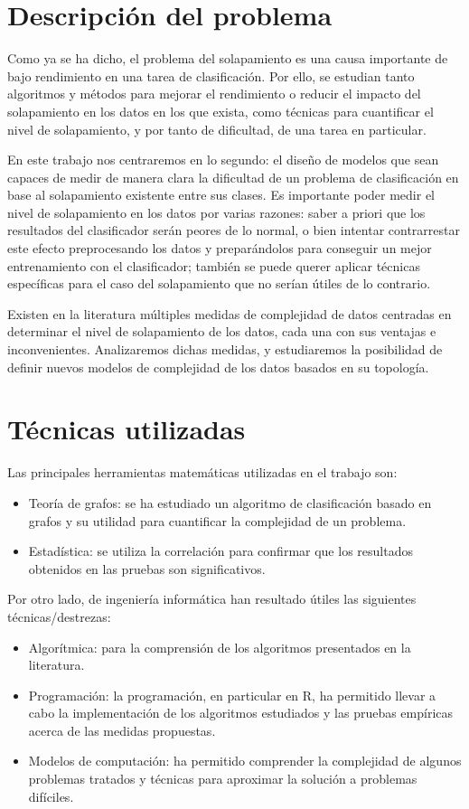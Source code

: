 \documentclass[a4paper,12pt]{report}
\theoremstyle{definition}
\begin{document}
\section{Descripción del problema}

Como ya se ha dicho, el problema del solapamiento es una causa importante de bajo rendimiento en una tarea de clasificación. Por ello, se estudian tanto algoritmos y métodos para mejorar el rendimiento o reducir el impacto del solapamiento en los datos en los que exista, como técnicas para cuantificar el nivel de solapamiento, y por tanto de dificultad, de una tarea en particular.

En este trabajo nos centraremos en lo segundo: el diseño de modelos que sean capaces de medir de manera clara la dificultad de un problema de clasificación en base al solapamiento existente entre sus clases. Es importante poder medir el nivel de solapamiento en los datos por varias razones: saber a priori que los resultados del clasificador serán peores de lo normal, o bien intentar contrarrestar este efecto preprocesando los datos y preparándolos para conseguir un mejor entrenamiento con el clasificador; también se puede querer aplicar técnicas específicas para el caso del solapamiento que no serían útiles de lo contrario.

Existen en la literatura múltiples medidas de complejidad de datos centradas en determinar el nivel de solapamiento de los datos, cada una con sus ventajas e inconvenientes. Analizaremos dichas medidas, y estudiaremos la posibilidad de definir nuevos modelos de complejidad de los datos basados en su topología.

\section{Técnicas utilizadas}
Las principales herramientas matemáticas utilizadas en el trabajo son:
\begin{itemize}
\item Teoría de grafos: se ha estudiado un algoritmo de clasificación basado en grafos y su utilidad para cuantificar la complejidad de un problema.
\item Estadística: se utiliza la correlación para confirmar que los resultados obtenidos en las pruebas son significativos.
\end{itemize}

Por otro lado, de ingeniería informática han resultado útiles las siguientes técnicas/destrezas:
\begin{itemize}
\item Algorítmica: para la comprensión de los algoritmos presentados en la literatura.
\item Programación: la programación, en particular en R, ha permitido llevar a cabo la implementación de los algoritmos estudiados y las pruebas empíricas acerca de las medidas propuestas.
\item Modelos de computación: ha permitido comprender la complejidad de algunos problemas tratados y técnicas para aproximar la solución a problemas difíciles.
\end{itemize}
\end{document}
